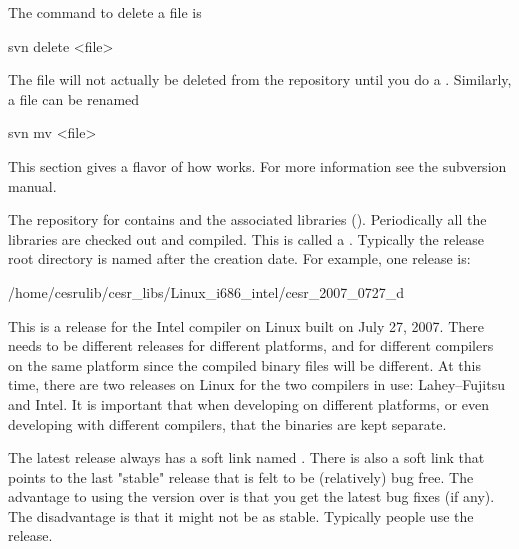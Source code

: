 The command to delete a file is
\begin{example}
  svn delete <file>
\end{example}
The file will not actually be deleted from the repository until you do a
. Similarly, a file can be renamed 
\begin{example}
  svn mv <file>
\end{example}

This section gives a flavor of how \svn works. For more information see
the subversion manual.


The \svn repository for \bmad contains \bmad and the associated
libraries (). Periodically all the libraries are checked
out and compiled. This is called a . Typically the release
root directory is named after the creation date. For example, one release is:
\begin{example}
  /home/cesrulib/cesr_libs/Linux_i686_intel/cesr_2007_0727_d
\end{example}
This is a release for the Intel compiler on Linux built on July 27,
2007. There needs to be different releases for different platforms,
and for different compilers on the same platform since the
compiled binary files will be different. At this time, there are
two releases on Linux for the two compilers in use:
Lahey--Fujitsu and Intel. It is important that when developing on
different platforms, or even developing with different compilers, that
the binaries are kept separate.

The latest release always has a soft link named . There is
also a  soft link that points to the last "stable" release
that is felt to be (relatively) bug free. The advantage to using the
 version over  is that you get the latest bug
fixes (if any). The disadvantage is that it might not be as
stable. Typically people use the  release.

